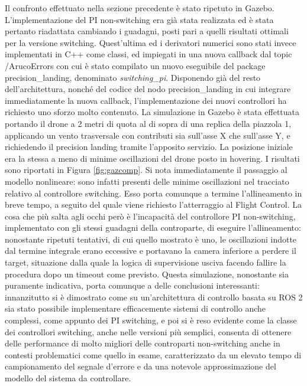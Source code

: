 \indent Il confronto effettuato nella sezione precedente è stato ripetuto in Gazebo. L'implementazione del PI non-switching era già stata realizzata ed è stata pertanto riadattata cambiando i guadagni, posti pari a quelli risultati ottimali per la versione switching. Quest'ultima ed i derivatori numerici sono stati invece implementati in C++ come classi, ed impiegati in una nuova callback dal topic /ArucoErrors con cui è stato compilato un nuovo eseguibile del package precision\_landing, denominato \emph{switching\_pi}. Disponendo già del resto dell'architettura, nonché del codice del nodo precision\_landing in cui integrare immediatamente la nuova callback, l'implementazione dei nuovi controllori ha richiesto uno sforzo molto contenuto. La simulazione in Gazebo è stata effettuata portando il drone a 2 metri di quota al di sopra di una replica della piazzola 1, applicando un vento trasversale con contributi sia sull'asse X che sull'asse Y, e richiedendo il precision landing tramite l'apposito servizio. La posizione iniziale era la stessa a meno di minime oscillazioni del drone posto in hovering. I risultati sono riportati in Figura \ref{fig:gazcomp}. Si nota immediatamente il passaggio al modello nonlineare: sono infatti presenti delle minime oscillazioni nel tracciato relativo al controllore switching. Esso porta comunque a termine l'allineamento in breve tempo, a seguito del quale viene richiesto l'atterraggio al Flight Control. La cosa che più salta agli occhi però è l'incapacità del controllore PI non-switching, implementato con gli stessi guadagni della controparte, di eseguire l'allineamento: nonostante ripetuti tentativi, di cui quello mostrato è uno, le oscillazioni indotte dal termine integrale erano eccessive e portavano la camera inferiore a perdere il target, situazione dalla quale la logica di supervisione usciva facendo fallire la procedura dopo un timeout come previsto. Questa simulazione, nonostante sia puramente indicativa, porta comunque a delle conclusioni interessanti: innanzitutto si è dimostrato come su un'architettura di controllo basata su ROS 2 sia stato possibile implementare efficacemente sistemi di controllo anche complessi, come appunto dei PI switching, e poi si è reso evidente come la classe dei controllori switching, anche nelle versioni più semplici, consenta di ottenere delle performance di molto migliori delle controparti non-switching anche in contesti problematici come quello in esame, caratterizzato da un elevato tempo di campionamento del segnale d'errore e da una notevole approssimazione del modello del sistema da controllare.

